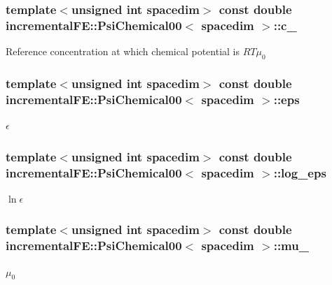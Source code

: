 \subsubsection[{\texorpdfstring{c\+\_\+0}{c_0}}]{\setlength{\rightskip}{0pt plus 5cm}template$<$unsigned int spacedim$>$ const double {\bf incremental\+F\+E\+::\+Psi\+Chemical00}$<$ spacedim $>$\+::c\+\_\hspace{0.3cm}{\ttfamily [private]}}\hypertarget{classincremental_f_e_1_1_psi_chemical00_a2ad0343d949c11ca7ce23618939a623b}{}\label{classincremental_f_e_1_1_psi_chemical00_a2ad0343d949c11ca7ce23618939a623b}
Reference concentration at which chemical potential is $RT\mu_0$ 
\subsubsection[{\texorpdfstring{eps}{eps}}]{\setlength{\rightskip}{0pt plus 5cm}template$<$unsigned int spacedim$>$ const double {\bf incremental\+F\+E\+::\+Psi\+Chemical00}$<$ spacedim $>$\+::eps\hspace{0.3cm}{\ttfamily [private]}}\hypertarget{classincremental_f_e_1_1_psi_chemical00_a8016f9e379c596ca0ed60479110a3178}{}\label{classincremental_f_e_1_1_psi_chemical00_a8016f9e379c596ca0ed60479110a3178}
$\epsilon$ 
\subsubsection[{\texorpdfstring{log\+\_\+eps}{log_eps}}]{\setlength{\rightskip}{0pt plus 5cm}template$<$unsigned int spacedim$>$ const double {\bf incremental\+F\+E\+::\+Psi\+Chemical00}$<$ spacedim $>$\+::log\+\_\+eps\hspace{0.3cm}{\ttfamily [private]}}\hypertarget{classincremental_f_e_1_1_psi_chemical00_a0288b7812d0350e1f38f740c010b9600}{}\label{classincremental_f_e_1_1_psi_chemical00_a0288b7812d0350e1f38f740c010b9600}
$\ln\epsilon$ 
\subsubsection[{\texorpdfstring{mu\+\_\+0}{mu_0}}]{\setlength{\rightskip}{0pt plus 5cm}template$<$unsigned int spacedim$>$ const double {\bf incremental\+F\+E\+::\+Psi\+Chemical00}$<$ spacedim $>$\+::mu\+\_\hspace{0.3cm}{\ttfamily [private]}}\hypertarget{classincremental_f_e_1_1_psi_chemical00_a3c264a3e33072def54f2376ee9a0b4ea}{}\label{classincremental_f_e_1_1_psi_chemical00_a3c264a3e33072def54f2376ee9a0b4ea}
$\mu_0$ 
